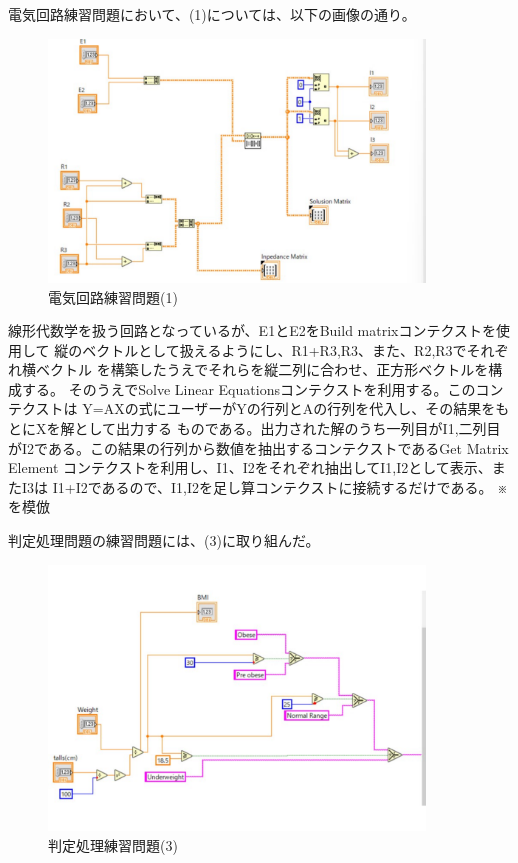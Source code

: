 \documentclass[a4paper,titlepage,11pt]{ltjsarticle}
\begin{document}
電気回路練習問題において、(1)については、以下の画像の通り。

\begin{figure}[H]
  \begin{center}
    \includegraphics[width=100mm]{electronics1b.pdf}
    \caption{電気回路練習問題(1)}
  \end{center}
\end{figure}

線形代数学を扱う回路となっているが、E1とE2をBuild matrixコンテクストを使用して
縦のベクトルとして扱えるようにし、R1+R3,R3、また、R2,R3でそれぞれ横ベクトル
を構築したうえでそれらを縦二列に合わせ、正方形ベクトルを構成する。
そのうえでSolve Linear Equationsコンテクストを利用する。このコンテクストは
Y=AXの式にユーザーがYの行列とAの行列を代入し、その結果をもとにXを解として出力する
ものである。出力された解のうち一列目がI1,二列目がI2である。この結果の行列から数値を抽出するコンテクストであるGet Matrix Element
コンテクストを利用し、I1、I2をそれぞれ抽出してI1,I2として表示、またI3は
I1+I2であるので、I1,I2を足し算コンテクストに接続するだけである。
※\cite{sankoga}を模倣

判定処理問題の練習問題には、(3)に取り組んだ。

\begin{figure}[H]
  \begin{center}
    \includegraphics[width=100mm]{jadge3.pdf}
    \caption{判定処理練習問題(3)}
  \end{center}
\end{figure}
\end{document}
